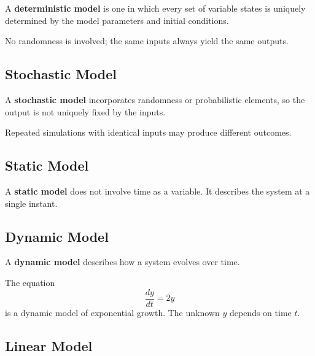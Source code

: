 \begin{definition}
A \textbf{deterministic model} is one in which every set of variable states is uniquely determined by the model parameters and initial conditions.
\end{definition}

\begin{remark}
No randomness is involved; the same inputs always yield the same outputs.
\end{remark}

\subsection{Stochastic Model}

\begin{definition}
A \textbf{stochastic model} incorporates randomness or probabilistic elements, so the output is not uniquely fixed by the inputs.
\end{definition}

\begin{remark}
Repeated simulations with identical inputs may produce different outcomes.
\end{remark}

\subsection{Static Model}

\begin{definition}
A \textbf{static model} does not involve time as a variable. It describes the system at a single instant.
\end{definition}

\subsection{Dynamic Model}

\begin{definition}
A \textbf{dynamic model} describes how a system evolves over time.
\end{definition}

\begin{example}
The equation
\[
  \frac{dy}{dt} = 2y
\]
is a dynamic model of exponential growth. The unknown $y$ depends on time $t$.
\end{example}

\subsection{Linear Model}

